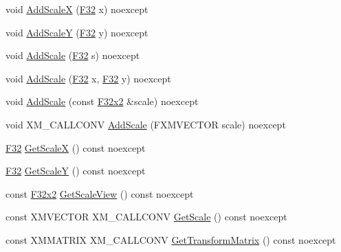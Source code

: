 \begin{DoxyCompactItemize}
\item 
void \mbox{\hyperlink{classmage_1_1_sprite_transform2_d_abda91fe68c22536383900e5d5d6f1c88}{Add\+ScaleX}} (\mbox{\hyperlink{namespacemage_aa97e833b45f06d60a0a9c4fc22ae02c0}{F32}} x) noexcept
\item 
void \mbox{\hyperlink{classmage_1_1_sprite_transform2_d_abc6fcc9b78da648b577d46b5a7b1ad26}{Add\+ScaleY}} (\mbox{\hyperlink{namespacemage_aa97e833b45f06d60a0a9c4fc22ae02c0}{F32}} y) noexcept
\item 
void \mbox{\hyperlink{classmage_1_1_sprite_transform2_d_a35a27eef9e2ed7f0e31956f26cd4511a}{Add\+Scale}} (\mbox{\hyperlink{namespacemage_aa97e833b45f06d60a0a9c4fc22ae02c0}{F32}} s) noexcept
\item 
void \mbox{\hyperlink{classmage_1_1_sprite_transform2_d_a4f5cc2ec6f6670c157b21f5d542a213a}{Add\+Scale}} (\mbox{\hyperlink{namespacemage_aa97e833b45f06d60a0a9c4fc22ae02c0}{F32}} x, \mbox{\hyperlink{namespacemage_aa97e833b45f06d60a0a9c4fc22ae02c0}{F32}} y) noexcept
\item 
void \mbox{\hyperlink{classmage_1_1_sprite_transform2_d_a979e0b7ececb5ba360656b8a0f93eeaf}{Add\+Scale}} (const \mbox{\hyperlink{namespacemage_aee4759dedc8def6c6dec26b5c7eddf29}{F32x2}} \&scale) noexcept
\item 
void X\+M\+\_\+\+C\+A\+L\+L\+C\+O\+NV \mbox{\hyperlink{classmage_1_1_sprite_transform2_d_ab9b799f1ffc57c97da87fe5e8b37e5a0}{Add\+Scale}} (F\+X\+M\+V\+E\+C\+T\+OR scale) noexcept
\item 
\mbox{\hyperlink{namespacemage_aa97e833b45f06d60a0a9c4fc22ae02c0}{F32}} \mbox{\hyperlink{classmage_1_1_sprite_transform2_d_a1c9dc98fb06dd807a0a8741c905323c6}{Get\+ScaleX}} () const noexcept
\item 
\mbox{\hyperlink{namespacemage_aa97e833b45f06d60a0a9c4fc22ae02c0}{F32}} \mbox{\hyperlink{classmage_1_1_sprite_transform2_d_a84425c2f3fa1ce2da55e268930b5efab}{Get\+ScaleY}} () const noexcept
\item 
const \mbox{\hyperlink{namespacemage_aee4759dedc8def6c6dec26b5c7eddf29}{F32x2}} \mbox{\hyperlink{classmage_1_1_sprite_transform2_d_aa146848b69ee8334122eddf542d97e37}{Get\+Scale\+View}} () const noexcept
\item 
const X\+M\+V\+E\+C\+T\+OR X\+M\+\_\+\+C\+A\+L\+L\+C\+O\+NV \mbox{\hyperlink{classmage_1_1_sprite_transform2_d_ae2858a4072b37382e82ac883dd80c706}{Get\+Scale}} () const noexcept
\item 
const X\+M\+M\+A\+T\+R\+IX X\+M\+\_\+\+C\+A\+L\+L\+C\+O\+NV \mbox{\hyperlink{classmage_1_1_sprite_transform2_d_a49a6de2c58c72bb52d53feb5c66332c1}{Get\+Transform\+Matrix}} () const noexcept
\end{DoxyCompactItemize}
